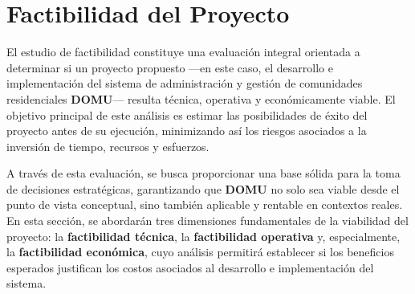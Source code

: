 
\section{Factibilidad del Proyecto}
El estudio de factibilidad constituye una evaluación integral orientada a determinar si un proyecto propuesto —en este caso, el desarrollo e implementación del sistema de administración y gestión de comunidades residenciales \textbf{DOMU}— resulta técnica, operativa y económicamente viable. El objetivo principal de este análisis es estimar las posibilidades de éxito del proyecto antes de su ejecución, minimizando así los riesgos asociados a la inversión de tiempo, recursos y esfuerzos. 

A través de esta evaluación, se busca proporcionar una base sólida para la toma de decisiones estratégicas, garantizando que \textbf{DOMU} no solo sea viable desde el punto de vista conceptual, sino también aplicable y rentable en contextos reales. En esta sección, se abordarán tres dimensiones fundamentales de la viabilidad del proyecto: la \textbf{factibilidad técnica}, la \textbf{factibilidad operativa} y, especialmente, la \textbf{factibilidad económica}, cuyo análisis permitirá establecer si los beneficios esperados justifican los costos asociados al desarrollo e implementación del sistema.
  
